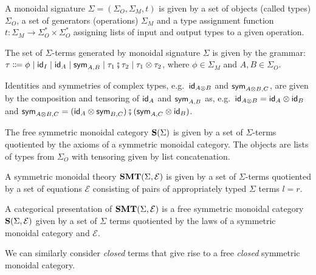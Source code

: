 \begin{definition}
	A monoidal signature $\Sigma = (\Sigma_{O}, \Sigma_{M}, t)$ is given by a set of objects (called types) $\Sigma_{O}$, a set of generators (operations) $\Sigma_{M}$ and a type assignment function $t\colon \Sigma_{M} \to \Sigma_{O}^{*} \times \Sigma_{O}^{*}$ assigning lists of input and output types to a given operation.
\end{definition}
\begin{definition}
	The set of $\Sigma$-terms generated by monoidal signature $\Sigma$ is given by the grammar:
	$\tau \Coloneqq \phi \;|\; \textsf{id}_{I} \;|\; \textsf{id}_{A} \;|\; \textsf{sym}_{A,B} \;|\; \tau_{1} \fatsemi \tau_{2} \;|\; \tau_{1} \otimes \tau_{2}$,
	where $\phi \in \Sigma_{M}$ and $A,B \in \Sigma_{O}$.
\end{definition}
Identities and symmetries of complex types, e.g.\ $\textsf{id}_{A \otimes B}$ and $\textsf{sym}_{A \otimes B, C}$, are given by the composition and tensoring of $\textsf{id}_{A}$ and $\textsf{sym}_{A,B}$ as, e.g.\ $\textsf{id}_{A \otimes B} = \textsf{id}_{A} \otimes \textsf{id}_{B}$ and $\textsf{sym}_{A \otimes B, C} = (\textsf{id}_{A} \otimes \textsf{sym}_{B,C}) \fatsemi (\textsf{sym}_{A,C} \otimes \textsf{id}_{B})$.
\begin{definition}
	The free symmetric monoidal category $\mathbf{S}(\Sigma)$ is given by a set of $\Sigma$-terms quotiented by the axioms of a symmetric monoidal category.
	The objects are lists of types from $\Sigma_{O}$ with tensoring given by list concatenation.
\end{definition}
\begin{definition}
	A symmetric monoidal theory $\mathbf{SMT}(\Sigma, \mathcal{E})$ is given by a set of $\Sigma$-terms quotiented by a set of equations $\mathcal{E}$ consisting of pairs of appropriately typed $\Sigma$ terms $l = r$.
\end{definition}
\begin{definition}
	A categorical presentation of  $\mathbf{SMT}(\Sigma, \mathcal{E})$ is a free symmetric monoidal category $\mathbf{S}(\Sigma, \mathcal{E})$ given by a set of $\Sigma$ terms quotiented by the laws of a symmetric monoidal category and $\mathcal{E}$.
\end{definition}

We can similarly consider \emph{closed} terms that give rise to a free \emph{closed} symmetric monoidal category.

